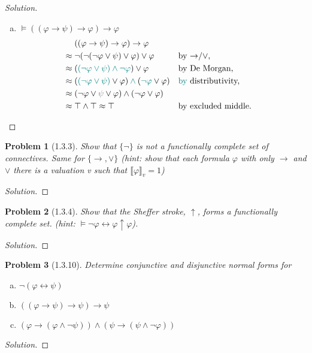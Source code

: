 \documentclass[letter]{article}
\newtheorem{problem}{Problem}
\theoremstyle{definition}
\newenvironment{solution}
{\begin{proof}[Solution]}
	{\end{proof}}
\renewcommand{\phi}{\varphi}
\begin{document}
\begin{solution}
\begin{enumerate}[(a)]
  \item $\models ((\phi \to \psi) \to \phi) \to \phi$
\begin{align*}
  & ((\phi \to \psi) \to \phi) \to \phi &
\\ \approx{}
  & \neg (\neg (\neg \phi \lor \psi) \lor \phi) \lor \phi
  && \text{by \tolor,}
\\ \approx{}
  & ({\color{teal}(\neg \phi \lor \psi) \land \neg \phi}) \lor \phi
  && \text{by De Morgan,}
\\ \approx{}
  & ({\color{teal}(\neg \phi \lor \psi)} \lor \phi) \colop{teal}{\land} ({\color{teal}\neg \phi} \lor \phi)
  && \text{{\color{teal}by} distributivity,}
\\ \approx{}
  & (\neg \phi \lor {\color{gray}\psi} \lor \phi) \land (\neg \phi \lor \phi)
  &&
\\ \approx{}
  & \top \land \top \approx \top
  && \text{by excluded middle.}
\end{align*}
\end{enumerate}
\end{solution}

\begin{problem}[1.3.3] Show that $\{ \neg \}$ is not a functionally complete set of connectives. Same for $\{\to, \lor\}$ (hint: show that each formula $\phi$ with only $\to$ and $\lor$ there is a valuation v such that $\llbracket \phi \rrbracket_v = 1$)
\end{problem}
\begin{solution}
\end{solution}

\begin{problem}[1.3.4] Show that the Sheffer stroke, $\uparrow$, forms a functionally complete set. (hint: $\models \neg \phi \leftrightarrow \phi \uparrow \phi$).
\end{problem}
\begin{solution}
\end{solution}


\begin{problem}[1.3.10] Determine conjunctive and disjunctive normal forms for
\begin{enumerate}[(a)]
    \item $\neg (\phi \leftrightarrow \psi)$
    \item $((\phi \to \psi) \to \psi) \to \psi$
    \item $(\phi \to (\phi \land \neg \psi)) \land (\psi \to (\psi \land \neg \phi))$
\end{enumerate}
\end{problem}
\begin{solution}
\end{solution}
\end{document}
